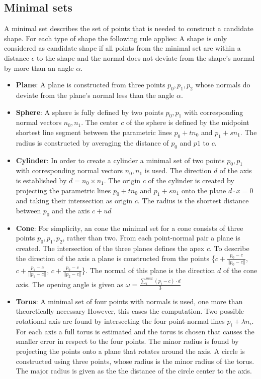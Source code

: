 \subsection{Minimal sets}
A minimal set describes the set of points that is needed to construct a candidate shape. 
For each type of shape the following rule applies: A shape is only considered as candidate shape if all points from the minimal set are within a distance $\epsilon$ to the shape and the normal does not deviate from the shape's normal by more than an angle $\alpha$. 

\begin{itemize}
	\item \textbf{Plane}: A plane is constructed from three points $p_0, p_1, p_2$ whose normals do deviate from the plane's normal less than the angle $\alpha$. 
	
	\item \textbf{Sphere}: A sphere is fully defined by two points $p_0, p_1$ with corresponding normal vectors $n_0, n_1$. The center $c$ of the sphere is defined by the midpoint shortest line segment between the parametric lines $p_0 + tn_0$ and $p_1 + sn_1$. The radius is constructed by averaging the distance of $p_0$ and $p1$ to $c$.

	\item \textbf{Cylinder}:
	In order to create a cylinder a minimal set of two points  $p_0, p_1$ with corresponding normal vectors $n_0, n_1$ is used. The direction $d$ of the axis is established by $d = n_0 \times n_1$. The origin $c$ of the cylinder is created by projecting the parametric lines $p_0 + tn_0$ and $p_1 + sn_1$ onto the plane $d \cdot x = 0$ and taking their intersection as origin $c$. The radius is the shortest distance between $p_0$ and the axis $c + ud$
	
	\item \textbf{Cone}:
	For simplicity, an cone the minimal set for a cone consists of three points $p_0, p_1, p_2$, rather than two. From each point-normal pair a plane is created. The intersection of the three planes defines the apex $c$. To describe the direction of the axis a plane is constructed from the points \{$c +  \frac{p_0 - c}{||p_0 - c||}$, $c +  \frac{p_1 - c}{||p_1 - c||}$, $c +  \frac{p_2 - c}{||p_2 - c||}$\}. The normal of this plane is the direction $d$ of the cone axis. The opening angle is given as $\omega = \frac{\sum_{i}^{max} (p_i - c)\cdot d}{3}$
	
	\item \textbf{Torus}:
	A minimal set of four points with normals is used, one more than theoretically necessary However, this eases the computation.
	Two possible rotational axis are found by intersecting the four point-normal lines $p_i +  \lambda n_i$\cite{marshall2001robust}. For each axis a full torus is estimated and the torus is chosen that causes the smaller error in respect to the four points. The minor radius is found by projecting the points onto a plane that rotates around the axis. A circle is constructed using three points, whose radius is the minor radius of the torus. The major radius is given as the the distance of the circle center to the axis. 


\end{itemize} 

